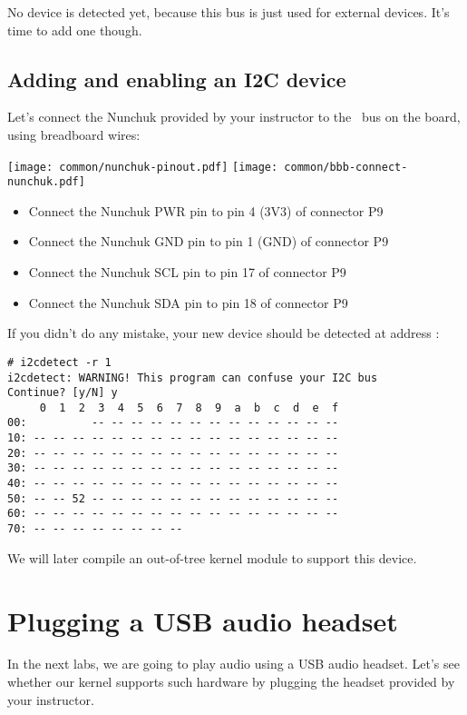 {No device is detected yet, because this bus is just
used for external devices. It's time to add one though.

\subsection{Adding and enabling an I2C device}

Let's connect the Nunchuk provided by your instructor
to the \busname\ bus on the board, using breadboard wires:

\texttt{[image: common/nunchuk-pinout.pdf]}
\texttt{[image: common/bbb-connect-nunchuk.pdf]}

\begin{itemize}
\item Connect the Nunchuk PWR pin to pin 4 (3V3) of connector P9
\item Connect the Nunchuk GND pin to pin 1 (GND) of connector P9
\item Connect the Nunchuk SCL pin to pin 17 of connector P9
\item Connect the Nunchuk SDA pin to pin 18 of connector P9
\end{itemize}

If you didn't do any mistake, your new device should be detected at
address :

\begin{verbatim}
# i2cdetect -r 1
i2cdetect: WARNING! This program can confuse your I2C bus
Continue? [y/N] y
     0  1  2  3  4  5  6  7  8  9  a  b  c  d  e  f
00:          -- -- -- -- -- -- -- -- -- -- -- -- --
10: -- -- -- -- -- -- -- -- -- -- -- -- -- -- -- --
20: -- -- -- -- -- -- -- -- -- -- -- -- -- -- -- --
30: -- -- -- -- -- -- -- -- -- -- -- -- -- -- -- --
40: -- -- -- -- -- -- -- -- -- -- -- -- -- -- -- --
50: -- -- 52 -- -- -- -- -- -- -- -- -- -- -- -- --
60: -- -- -- -- -- -- -- -- -- -- -- -- -- -- -- --
70: -- -- -- -- -- -- -- --
\end{verbatim}

We will later compile an out-of-tree kernel module to support this device.

\section{Plugging a USB audio headset}

In the next labs, we are going to play audio using a USB audio headset.
Let's see whether our kernel supports such hardware by plugging the
headset provided by your instructor.

}
